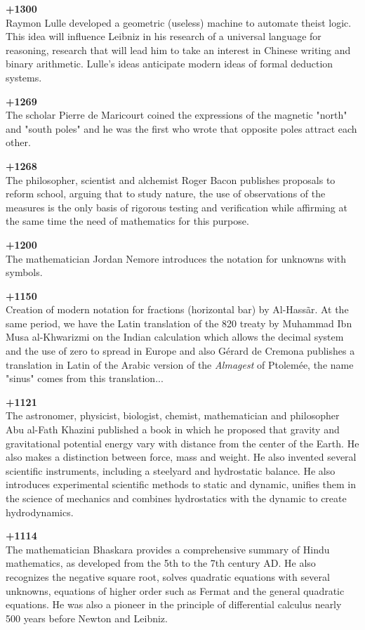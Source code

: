 \textbf{+1300}\\
Raymon Lulle developed a geometric (useless) machine to automate theist logic. This idea will influence Leibniz in his research of a universal language for reasoning, research that will lead him to take an interest in Chinese writing and binary arithmetic. Lulle's ideas anticipate modern ideas of formal deduction systems.

\textbf{+1269}\\
The scholar Pierre de Maricourt coined the expressions of the magnetic "north" and "south poles" and he was the first who wrote that opposite poles attract each other.

\textbf{+1268}\\
The philosopher, scientist and alchemist Roger Bacon publishes proposals to reform school, arguing that to study nature, the use of observations of the measures is the only basis of rigorous testing and verification while affirming at the same time the need of mathematics for this purpose.

\textbf{+1200}\\
The mathematician Jordan Nemore introduces the notation for unknowns with symbols.

\textbf{+1150}\\
Creation of modern notation for fractions (horizontal bar) by Al-Hassãr. At the same period, we have the Latin translation of the 820 treaty by Muhammad Ibn Musa al-Khwarizmi on the Indian calculation which allows the decimal system and the use of zero to spread in Europe and also Gérard de Cremona publishes a translation in Latin of the Arabic version of the \textit{Almagest} of Ptolemée, the name "sinus" comes from this translation...

\textbf{+1121}\\
The astronomer, physicist, biologist, chemist, mathematician and philosopher Abu al-Fath Khazini published a book in which he proposed that gravity and gravitational potential energy vary with distance from the center of the Earth. He also makes a distinction between force, mass and weight. He also invented several scientific instruments, including a steelyard and hydrostatic balance. He also introduces experimental scientific methods to static and dynamic, unifies them in the science of mechanics and combines hydrostatics with the dynamic to create hydrodynamics.

\textbf{+1114}\\
The mathematician Bhaskara provides a comprehensive summary of Hindu mathematics, as developed from the 5th to the 7th century AD. He also recognizes the negative square root, solves quadratic equations with several unknowns, equations of higher order such as Fermat and the general quadratic equations. He was also a pioneer in the principle of differential calculus nearly 500 years before Newton and Leibniz.

